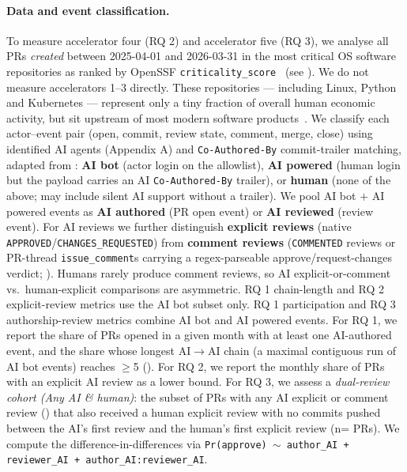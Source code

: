 \documentclass{article}
\begin{document}
\paragraph{Data and event classification.} To measure accelerator four (RQ 2) and accelerator five (RQ 3), we analyse all \PLACEHOLDERNPRS{} PRs \emph{created} between 2025-04-01 and 2026-03-31 in the \PLACEHOLDERPRACTIVE{} most critical OS software repositories as ranked by OpenSSF \texttt{criticality\_score}~\citep{ossf-criticality} (see ). We do not measure accelerators 1--3 directly. These \PLACEHOLDERPRACTIVE{} repositories --- including Linux, Python and Kubernetes --- represent only a tiny fraction of overall human economic activity, but sit upstream of most modern software products~\citep{glasswing2026}. We classify each actor--event pair (open, commit, review state, comment, merge, close) using identified AI agents (Appendix A) and \texttt{Co-Authored-By} commit-trailer matching, adapted from \citet{ghaleb2026fingerprinting}: \textbf{AI bot} (actor login on the allowlist), \textbf{AI powered} (human login but the payload carries an AI \texttt{Co-Authored-By} trailer), or \textbf{human} (none of the above; may include silent AI support without a trailer). We pool AI bot $+$ AI powered events as \textbf{AI authored} (PR open event) or \textbf{AI reviewed} (review event). For AI reviews we further distinguish \textbf{explicit reviews} (native \texttt{APPROVED}/\texttt{CHANGES\_REQUESTED}) from \textbf{comment reviews} (\texttt{COMMENTED} reviews or PR-thread \texttt{issue\_comment}s carrying a regex-parseable approve/request-changes verdict; ). Humans rarely produce comment reviews, so AI explicit-or-comment vs.\ human-explicit comparisons are asymmetric. RQ 1 chain-length and RQ 2 explicit-review metrics use the AI bot subset only. RQ 1 participation and RQ 3 authorship-review metrics combine AI bot and AI powered events.
For RQ 1, we report the share of PRs opened in a given month with at least one AI-authored event, and the share whose longest AI$\to$AI chain (a maximal contiguous run of AI bot events) reaches $\geq$5 (). For RQ 2, we report the monthly share of PRs with an explicit AI review as a lower bound. For RQ 3, we assess a \emph{dual-review cohort (Any AI \& human)}: the subset of \PLACEHOLDERAIOPPRS{} PRs with any AI explicit or comment review () that also received a human explicit review with no commits pushed between the AI's first review and the human's first explicit review (n=\PLACEHOLDERDIDN{} PRs). We compute the difference-in-differences via \texttt{Pr(approve) $\sim$ author\_AI + reviewer\_AI + author\_AI:reviewer\_AI}.
\end{document}
